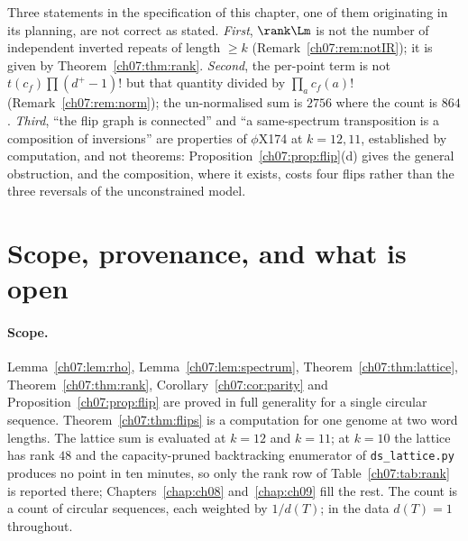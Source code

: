 \begin{remark}\label{ch07:rem:corrections}
Three statements in the specification of this chapter, one of them originating in its planning,
are not correct as stated. \emph{First}, $\rank\Lm$ is not the number of independent inverted
repeats of length $\ge k$ (Remark~\ref{ch07:rem:notIR}); it is given by Theorem~\ref{ch07:thm:rank}.
\emph{Second}, the per-point term is not $t(c_f)\prod(d^+-1)!$ but that quantity divided by
$\prod_a c_f(a)!$ (Remark~\ref{ch07:rem:norm}); the un-normalised sum is $2756$ where the count is
$864$. \emph{Third}, ``the flip graph is connected'' and ``a same-spectrum transposition is a
composition of inversions'' are properties of $\phi$X174 at $k=12,11$, established by
computation, and not theorems: Proposition~\ref{ch07:prop:flip}(d) gives the general obstruction,
and the composition, where it exists, costs four flips rather than the three reversals of the
unconstrained model.
\end{remark}

\section{Scope, provenance, and what is open}

\paragraph{Scope.} Lemma~\ref{ch07:lem:rho}, Lemma~\ref{ch07:lem:spectrum}, Theorem~\ref{ch07:thm:lattice},
Theorem~\ref{ch07:thm:rank}, Corollary~\ref{ch07:cor:parity} and Proposition~\ref{ch07:prop:flip} are proved
in full generality for a single circular sequence. Theorem~\ref{ch07:thm:flips} is a computation
for one genome at two word lengths. The lattice sum is evaluated at $k=12$ and $k=11$; at
$k=10$ the lattice has rank $48$ and the capacity-pruned backtracking enumerator of
\texttt{ds\_lattice.py} produces no point in ten minutes, so only the rank row of
Table~\ref{ch07:tab:rank} is reported there; Chapters~\ref{chap:ch08} and~\ref{chap:ch09} fill the
rest. The count is a count of circular sequences, each
weighted by $1/d(T)$; in the data $d(T)=1$ throughout.

